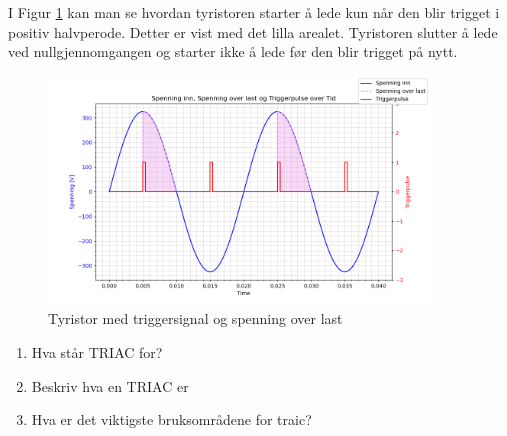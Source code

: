 \begin{solution}[name=Løsningsforslag]
I Figur \ref{fig:tyrTriggplotSOL} kan man se hvordan tyristoren starter å lede kun når den blir trigget i positiv halvperode. Detter er vist med det lilla arealet. Tyristoren slutter å lede ved nullgjennomgangen og starter ikke å lede før den blir trigget på nytt.

\begin{figure}[H]
	\centering
	\includegraphics[width=0.9\textwidth]{tyristor/plot/tyristor3SOL.png}
	\caption{Tyristor med triggersignal og spenning over last}
	\label{fig:tyrTriggplotSOL}
\end{figure}

\end{solution}





\begin{question}[name=Spørsmål, topic=tyristor]


	\begin{enumerate}[label=\roman*)]
		\item Hva står TRIAC for?
		\item Beskriv hva en TRIAC er
		\item Hva er det viktigste bruksområdene for traic?
	
	\end{enumerate}
\end{question}



\vspace{0.5cm} %


